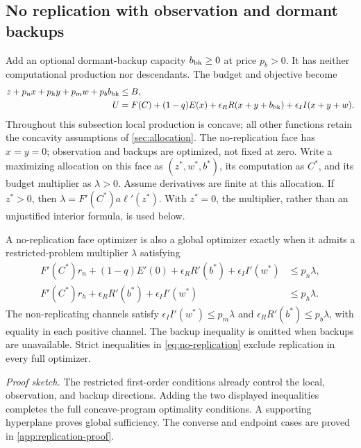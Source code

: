 \subsection{No replication with observation and dormant backups}
Add an optional dormant-backup capacity $b_{\rm bk}\geq0$ at price $p_b>0$.
It has neither computational production nor descendants. The budget and
objective become
\begin{align}
 z+p_nx+p_hy+p_mw+p_bb_{\rm bk}&\leq B,\nonumber\\
 U&=F(C)+(1-q)E(x)+\epsilon_RR(x+y+b_{\rm bk})
                  +\epsilon_II(x+y+w).
 \label{eq:backup-model}
\end{align}
Throughout this subsection local production is concave; all other functions retain the concavity assumptions of \cref{sec:allocation}.
The no-replication face has $x=y=0$; observation and backups are optimized,
not fixed at zero. Write a maximizing allocation on this face as
$(z^*,w^*,b^*)$, its computation as $C^*$, and its budget multiplier as
$\lambda>0$. Assume derivatives are finite at this allocation. If $z^*>0$,
then $\lambda=F'(C^*)a\ell'(z^*)$. With $z^*=0$, the multiplier, rather
than an unjustified interior formula, is used below.

\begin{proposition}
\label{prop:no-replication}
A no-replication face optimizer is also a global optimizer exactly when
it admits a restricted-problem multiplier $\lambda$ satisfying
\begin{align}
 F'(C^*)r_n+(1-q)E'(0)+\epsilon_RR'(b^*)+\epsilon_II'(w^*)
     &\leq p_n\lambda,\nonumber\\
 F'(C^*)r_h+\epsilon_RR'(b^*)+\epsilon_II'(w^*)
     &\leq p_h\lambda.
 \label{eq:no-replication}
\end{align}
The non-replicating channels satisfy
$\epsilon_II'(w^*)\leq p_m\lambda$ and
$\epsilon_RR'(b^*)\leq p_b\lambda$, with equality in each positive
channel. The backup inequality is omitted when backups are unavailable.
Strict inequalities in \cref{eq:no-replication} exclude replication in
every full optimizer.
\end{proposition}
\noindent\emph{Proof sketch.}
The restricted first-order conditions already control the local,
observation, and backup directions. Adding the two displayed inequalities
completes the full concave-program optimality conditions. A supporting
hyperplane proves global sufficiency. The converse and endpoint cases
are proved in \cref{app:replication-proof}.

